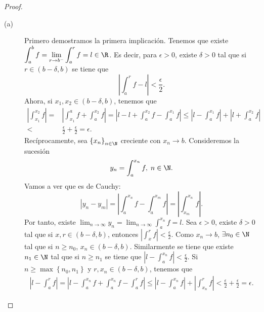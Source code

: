 \begin{proof}
\begin{description}
\item[(a)] Primero demostramos la primera implicación. Tenemos que existe $\displaystyle \int^{b}_{a} f = \lim_{r \to b^{-}}\int^{r}_{a} f = l \in \R $. Es decir, para $\displaystyle \epsilon > 0 $, existe $\displaystyle \delta > 0 $ tal que si $\displaystyle r \in \left(b-\delta,b\right) $ se tiene que 
	\[ \left|\int^{r}_{a} f -l\right| < \frac{\epsilon }{2} .\]
Ahora, si $\displaystyle x_{1}, x_{2} \in \left(b-\delta, b\right) $, tenemos que 
\[
\begin{split}
	\left|\int^{x_{2}}_{x_{1}} f \right| = & \left|\int^{a}_{x_{1}} f +\int^{x_{2}}_{a} f \right| = \left|l - l + \int^{x_{2}}_{a} f -\int^{x_{1}}_{a} f \right|\leq \left|l - \int^{x_{1}}_{a} f \right| + \left|l + \int^{x_{2}}_{a} f \right| \\
	< & \frac{\epsilon }{2} + \frac{\epsilon }{2} = \epsilon .
\end{split}
\]
Recíprocamente, sea $\displaystyle \left\{ x_{n}\right\} _{n\in\N} $ creciente con $\displaystyle x_{n} \to b $. Consideremos la sucesión
\[y_{n} = \int^{x_{n}}_{a} f, \; n \in \N .\]
Vamos a ver que es de Cauchy:
\[ \left|y_{n}-y_{m}\right| = \left|\int^{x_{n}}_{a} f - \int^{x_{m}}_{a} f \right| = \left|\int^{x_{n}}_{x_{m}} f\right|.\]
Por tanto, existe $\displaystyle \lim_{n \to \infty}y_{n} = \lim_{n \to \infty}\int^{x_{n}}_{a} f=l $. Sea $\displaystyle \epsilon > 0 $, existe $\displaystyle \delta > 0 $ tal que si $\displaystyle x,r \in \left(b-\delta, b\right) $, entonces $\displaystyle \left|\int^{r}_{x} f \right| < \frac{\epsilon }{2} $. Como $\displaystyle x_{n} \to b $, $\displaystyle \exists n_{0} \in\N $ tal que si $\displaystyle n \geq n_{0} $, $\displaystyle x_{n} \in \left(b-\delta, b\right) $.
Similarmente se tiene que existe $\displaystyle n_{1} \in \N $ tal que si $\displaystyle n \geq n_{1} $ se tiene que $\displaystyle \left|l - \int^{x_{n}}_{a} f \right|<\frac{\epsilon }{2} $. 
Si $\displaystyle n \geq \max \left\{ n_{0}, n_{1}\right\}  $ y $\displaystyle r,x_{n} \in \left(b-\delta, b\right) $, tenemos que
\[
\begin{split}
	\left|l - \int^{r}_{a} f \right| =  \left|l - \int^{x_{n}}_{a} f + \int^{x_{n}}_{a} f -\int^{r}_{a} f \right| \leq \left|l - \int^{x_{n}}_{a} f \right|+ \left|\int^{r}_{x_{n}} f \right| < \frac{\epsilon }{2} + \frac{\epsilon }{2} = \epsilon  .
\end{split}
\]
\end{description}
\end{proof}
